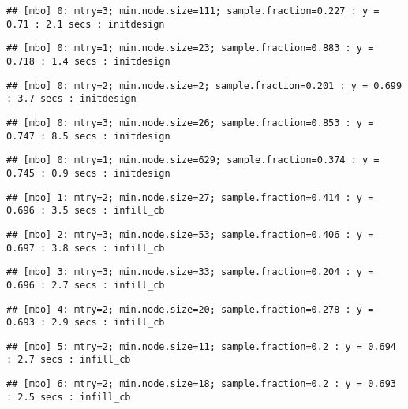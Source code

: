 \documentclass[
]{article}
\begin{document}
\begin{verbatim}
## [mbo] 0: mtry=3; min.node.size=111; sample.fraction=0.227 : y = 0.71 : 2.1 secs : initdesign
\end{verbatim}

\begin{verbatim}
## [mbo] 0: mtry=1; min.node.size=23; sample.fraction=0.883 : y = 0.718 : 1.4 secs : initdesign
\end{verbatim}

\begin{verbatim}
## [mbo] 0: mtry=2; min.node.size=2; sample.fraction=0.201 : y = 0.699 : 3.7 secs : initdesign
\end{verbatim}

\begin{verbatim}
## [mbo] 0: mtry=3; min.node.size=26; sample.fraction=0.853 : y = 0.747 : 8.5 secs : initdesign
\end{verbatim}

\begin{verbatim}
## [mbo] 0: mtry=1; min.node.size=629; sample.fraction=0.374 : y = 0.745 : 0.9 secs : initdesign
\end{verbatim}

\begin{verbatim}
## [mbo] 1: mtry=2; min.node.size=27; sample.fraction=0.414 : y = 0.696 : 3.5 secs : infill_cb
\end{verbatim}

\begin{verbatim}
## [mbo] 2: mtry=3; min.node.size=53; sample.fraction=0.406 : y = 0.697 : 3.8 secs : infill_cb
\end{verbatim}

\begin{verbatim}
## [mbo] 3: mtry=3; min.node.size=33; sample.fraction=0.204 : y = 0.696 : 2.7 secs : infill_cb
\end{verbatim}

\begin{verbatim}
## [mbo] 4: mtry=2; min.node.size=20; sample.fraction=0.278 : y = 0.693 : 2.9 secs : infill_cb
\end{verbatim}

\begin{verbatim}
## [mbo] 5: mtry=2; min.node.size=11; sample.fraction=0.2 : y = 0.694 : 2.7 secs : infill_cb
\end{verbatim}

\begin{verbatim}
## [mbo] 6: mtry=2; min.node.size=18; sample.fraction=0.2 : y = 0.693 : 2.5 secs : infill_cb
\end{verbatim}
\end{document}
